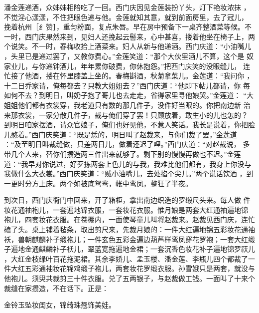 潘金莲递酒，众姊妹相陪吃了一回。西门庆因见金莲装扮丫头，灯下艳妆浓抹
，不觉淫心漾漾，不住把眼色递与他。金莲就知其意，就到前面房里，去了冠儿，
挽着杭州［纟赞］，重匀粉面，复点朱唇。早在房中预备下一桌齐整酒菜等候。不
一时，西门庆果然来到，见妇人还挽起云髻来，心中甚喜，搂着他坐在椅子上，两
个说笑。不一时，春梅收拾上酒菜来。妇人从新与他递酒。西门庆道：“小油嘴儿
，头里已是递过罢了，又教你费心。”金莲笑道：“那个大伙里酒儿不算，这个是
奴家业儿，与你递钟酒儿，年年累你破费，你休抱怨。”把西门庆笑的没眼缝儿，
连忙接了他酒，搂在怀里膝盖上坐的。春梅斟酒，秋菊拿菜儿。金莲道：“我问你
，十二日乔家请，俺每都去？只教大姐姐去？”西门庆道：“他即下帖儿都请，你
每如何不去？到明日，叫奶子抱了哥儿也去走走，省得家里寻他娘哭。”金莲道：
“大姐姐他们都有衣裳穿，我老道只有数的那几件子，没件好当眼的。你把南边新
治来那衣裳，一家分散几件子，裁与俺们穿了罢！只顾放着，敢生小的儿也怎的？
到明日咱家摆酒，请众官娘子，俺们也好见他，不惹人笑话。我长是说着，你把脸
儿憨着。”西门庆笑道：“既是恁的，明日叫了赵裁来，与你们裁了罢，”金莲道
：“及至明日叫裁缝做，只差两日儿，做着还迟了哩。”西门庆道：“对赵裁说，
多带几个人来，替你们攒造两三件出来就够了。剩下别的慢慢再做也不迟。”金莲
道：“我早对你说过，好歹拣两套上色儿的与我，我难比他们都有，我身上你没与
我做什么大衣裳。”西门庆笑道：“贼小油嘴儿，去处掐个尖儿。”两个说话饮酒
，到一更时分方上床。两个如被底鸳鸯，帐中鸾凤，整狂了半夜。

到次日，西门庆衙门中回来，开了箱柜，拿出南边织造的罗缎尺头来。每人做
件妆花通袖袍儿，一套遍地锦衣服，一套妆花衣服。惟月娘是两套大红通袖遍地锦
袍儿，四套妆花衣服。在卷棚内，一面使琴童儿叫将赵裁来。赵裁见西门庆，连忙
磕了头。桌上铺着毡条，取出剪尺来，先裁月娘的：一件大红遍地锦五彩妆花通袖
袄，兽朝麒麟补子缎袍儿；一件玄色五彩金遍边葫芦样鸾凤穿花罗袍；一套大红缎
子遍地金通麒麟补子袄儿，翠蓝宽拖遍地金裙；一套沉香色妆花补子遍地锦罗祆儿
，大红金枝绿叶百花拖泥裙。其余李娇儿、孟玉楼、潘金莲、李瓶儿四个都裁了一
件大红五彩通袖妆花锦鸡缎子袍儿，两套妆花罗缎衣服。孙雪娥只是两套，就没与
他袍儿。须臾共裁剪三十件衣服。兑了五两银子，与赵裁做工钱。一面叫了十来个
裁缝在家攒造，不在话下。正是：

金铃玉坠妆闺女，锦绮珠翘饰美娃。